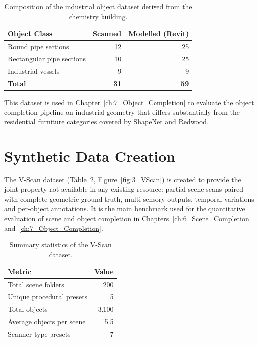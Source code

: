 \begin{table}[htbp]
    \centering
    \caption[Industrial object dataset]{Composition of the industrial object dataset derived from the chemistry building.}
    \label{tab:3_chemistry_metrics}
    \begin{tabular}{l r r}
        \toprule
        \textbf{Object Class} & \textbf{Scanned} & \textbf{Modelled (Revit)} \\
        \midrule
        Round pipe sections       & 12 & 25 \\
        Rectangular pipe sections & 10 & 25 \\
        Industrial vessels        &  9 &  9 \\
        \midrule
        \textbf{Total}            & \textbf{31} & \textbf{59} \\
        \bottomrule
    \end{tabular}
\end{table}

This dataset is used in Chapter~\ref{ch:7_Object_Completion} to evaluate the object completion pipeline on industrial geometry that differs substantially from the residential furniture categories covered by ShapeNet and Redwood.

\section{Synthetic Data Creation}
\label{sec:3_synthetic}

The V-Scan dataset (Table~\ref{tab:vscan_summary}, Figure~\ref{fig:3_VScan}) is created to provide the joint property not available in any existing resource: partial scene scans paired with complete geometric ground truth, multi-sensory outputs, temporal variations and per-object annotations. It is the main benchmark used for the quantitative evaluation of scene and object completion in Chapters~\ref{ch:6_Scene_Completion} and~\ref{ch:7_Object_Completion}.

\begin{table}[h]
    \centering
    \caption[V-Scan dataset summary]{Summary statistics of the V-Scan dataset.}
    \label{tab:vscan_summary}
    \begin{tabular}{l r}
        \toprule
        \textbf{Metric} & \textbf{Value} \\
        \midrule
        Total scene folders        & 200 \\
        Unique procedural presets  & 5 \\
        Total objects              & 3{,}100 \\
        Average objects per scene  & 15.5 \\
        Scanner type presets       & 7 \\
        \bottomrule
    \end{tabular}
\end{table}

